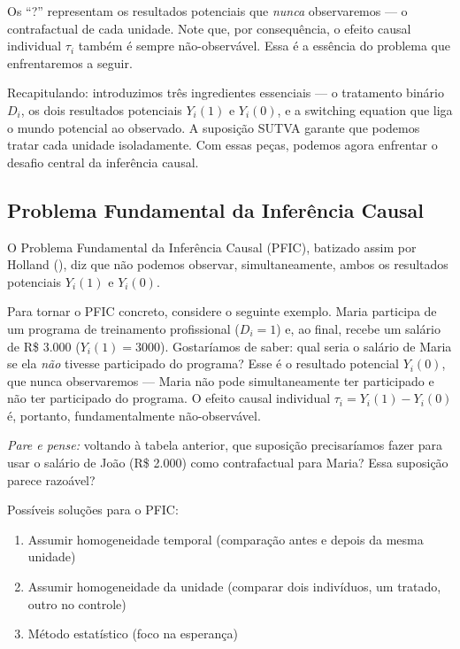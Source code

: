 \documentclass[
]{article}
\begin{document}
Os ``?'' representam os resultados potenciais que \emph{nunca} observaremos --- o contrafactual de cada unidade. Note que, por consequência, o efeito causal individual \(\tau_i\) também é sempre não-observável. Essa é a essência do problema que enfrentaremos a seguir.

Recapitulando: introduzimos três ingredientes essenciais --- o tratamento binário \(D_i\), os dois resultados potenciais \(Y_i(1)\) e \(Y_i(0)\), e a switching equation que liga o mundo potencial ao observado. A suposição SUTVA garante que podemos tratar cada unidade isoladamente. Com essas peças, podemos agora enfrentar o desafio central da inferência causal.

\subsection{Problema Fundamental da Inferência Causal}\label{problema-fundamental-da-inferuxeancia-causal}

O Problema Fundamental da Inferência Causal (PFIC), batizado assim por Holland (), diz que não podemos observar, simultaneamente, ambos os resultados potenciais \(Y_i(1)\) e \(Y_i(0)\).

Para tornar o PFIC concreto, considere o seguinte exemplo. Maria participa de um programa de treinamento profissional (\(D_i = 1\)) e, ao final, recebe um salário de R\$ 3.000 (\(Y_i(1) = 3000\)). Gostaríamos de saber: qual seria o salário de Maria se ela \emph{não} tivesse participado do programa? Esse é o resultado potencial \(Y_i(0)\), que nunca observaremos --- Maria não pode simultaneamente ter participado e não ter participado do programa. O efeito causal individual \(\tau_i = Y_i(1) - Y_i(0)\) é, portanto, fundamentalmente não-observável.

\emph{Pare e pense:} voltando à tabela anterior, que suposição precisaríamos fazer para usar o salário de João (R\$ 2.000) como contrafactual para Maria? Essa suposição parece razoável?

Possíveis soluções para o PFIC:

\begin{enumerate}
\def\labelenumi{\arabic{enumi}.}
\item
  Assumir homogeneidade temporal (comparação antes e depois da mesma unidade)
\item
  Assumir homogeneidade da unidade (comparar dois indivíduos, um tratado, outro no controle)
\item
  Método estatístico (foco na esperança)
\end{enumerate}
\end{document}
